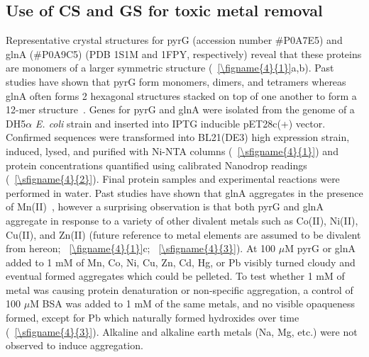 \documentclass[../main/main]{subfiles}
\begin{document}
\subsection{Use of CS and GS for toxic metal removal}
Representative crystal structures for pyrG (accession number \#{}P0A7E5) and glnA (\#{}P0A9C5) (PDB 1S1M and 1FPY, respectively) reveal that these proteins are monomers of a larger symmetric structure (\FIGURE~\ref{\figname{4}{1}}a,b). Past studies have shown that pyrG form monomers, dimers, and tetramers\cite{liu2011} whereas glnA often forms 2 hexagonal structures stacked on top of one another to form a 12-mer structure~\cite{valentine1968}. Genes for pyrG and glnA were isolated from the genome of a DH5$\alpha$ \textit{E. coli} strain and inserted into IPTG inducible pET28c(+) vector. Confirmed sequences were transformed into BL21(DE3) high expression strain, induced, lysed, and purified with Ni-NTA columns (\sFIGURE~\ref{\sfigname{4}{1}}) and protein concentrations quantified using calibrated Nanodrop readings (\sFIGURE~\ref{\sfigname{4}{2}}). Final protein samples and experimental reactions were performed in water.
Past studies have shown that glnA aggregates in the presence of Mn(II)~\cite{valentine1968,miller1974}, however a surprising observation is that both pyrG and glnA aggregate in response to a variety of other divalent metals such as Co(II), Ni(II), Cu(II), and Zn(II) (future reference to metal elements are assumed to be divalent from hereon; \FIGURE~\ref{\figname{4}{1}}c; \sFIGURE~\ref{\sfigname{4}{3}}).
At 100 $\mu$M pyrG or glnA added to 1 mM of Mn, Co, Ni, Cu, Zn, Cd, Hg, or Pb visibly turned cloudy and eventual formed aggregates which could be pelleted. To test whether 1 mM of metal was causing protein denaturation or non-specific aggregation, a control of 100 $\mu$M BSA was added to 1 mM of the same metals, and no visible opaqueness formed, except for Pb which naturally formed hydroxides over time (\sFIGURE~\ref{\sfigname{4}{3}}). Alkaline and alkaline earth metals (Na, Mg, etc.) were not observed to induce aggregation.
\end{document}
